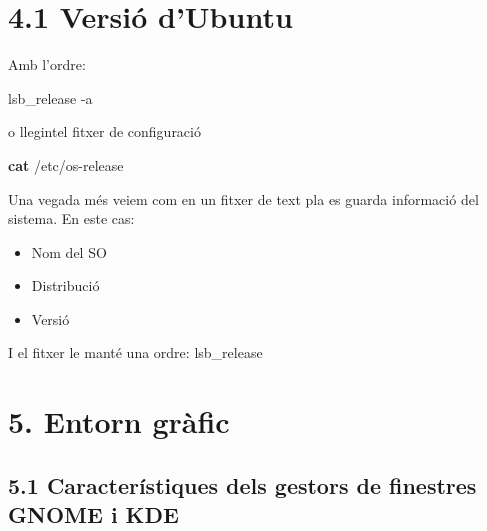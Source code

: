 \documentclass[
  a4paper,
]{article}
\newenvironment{Shaded}{\begin{snugshade}}{\end{snugshade}}
\newcommand{\AttributeTok}[1]{\textcolor[rgb]{0.13,0.29,0.53}{#1}}
\newcommand{\ExtensionTok}[1]{#1}
\newcommand{\FunctionTok}[1]{\textcolor[rgb]{0.13,0.29,0.53}{\textbf{#1}}}
\newcommand{\NormalTok}[1]{#1}
\providecommand{\tightlist}{%
  \setlength{\itemsep}{0pt}\setlength{\parskip}{0pt}}
\begin{document}
\section{4.1 Versió d'Ubuntu}\label{versiuxf3-dubuntu}

Amb l'ordre:

\begin{Shaded}
\begin{Highlighting}[]
\ExtensionTok{lsb\_release} \AttributeTok{{-}a}
\end{Highlighting}
\end{Shaded}

o llegintel fitxer de configuració

\begin{Shaded}
\begin{Highlighting}[]
\FunctionTok{cat}\NormalTok{ /etc/os{-}release}
\end{Highlighting}
\end{Shaded}

Una vegada més veiem com en un fitxer de text pla es guarda informació
del sistema. En este cas:

\begin{itemize}
\tightlist
\item
  Nom del SO
\item
  Distribució
\item
  Versió
\end{itemize}

I el fitxer le manté una ordre: lsb\_release

\section{5. Entorn gràfic}\label{entorn-gruxe0fic}

\subsection{5.1 Característiques dels gestors de finestres GNOME i
KDE}\label{caracteruxedstiques-dels-gestors-de-finestres-gnome-i-kde}
\end{document}
